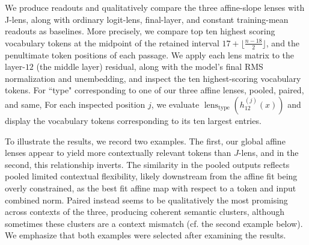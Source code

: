 \documentclass[10pt,oneside,reqno]{amsart}
\theoremstyle{definition}
\numberwithin{equation}{section}
\begin{document}
We produce readouts and qualitatively compare the three affine-slope lenses with J-lens, along with ordinary logit-lens, final-layer, and constant training-mean readouts as baselines. More precisely, we compare top ten highest scoring vocabulary tokens at the midpoint of the retained interval $17+\lfloor\frac{n-18}{2} \rfloor$, and the penultimate token positions of each passage. We apply each lens matrix to the layer-$12$ (the middle layer) residual, along with the model’s final RMS normalization and unembedding, and inspect the ten highest-scoring vocabulary tokens. For ``type" corresponding to one of our three affine lenses, pooled, paired, and same, For each inspected position $j$, we evaluate
$\operatorname{lens}_{\mathrm{type}}(h_{12}^{(j)}(x))$ and display the vocabulary tokens corresponding to its ten largest entries. 



To illustrate the results, we record two examples. The first, our global affine lenses appear to yield more contextually relevant tokens than $J$-lens, and in the second, this relationship inverts. The similarity in the pooled outputs reflects pooled limited contextual flexibility, likely downstream from the affine fit being overly constrained, as the best fit affine map with respect to a token and input combined norm. Paired instead seems to be qualitatively the most promising across contexts of the three, producing coherent semantic clusters, although sometimes these clusters are a context mismatch (cf. the second example below). We emphasize that both examples were selected after examining the results.
\end{document}
